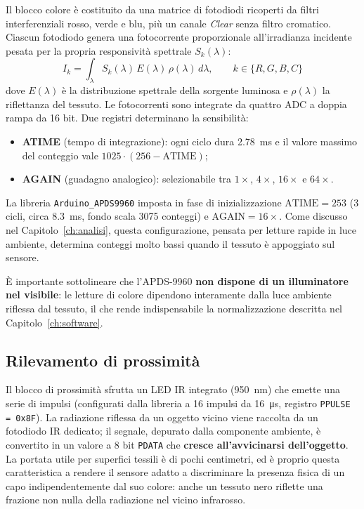 \documentclass[11pt,a4paper,twoside,openany]{report}
\begin{document}
Il blocco colore è costituito da una matrice di fotodiodi ricoperti da
filtri interferenziali rosso, verde e blu, più un canale
\textit{Clear} senza filtro cromatico. Ciascun fotodiodo genera una
fotocorrente proporzionale all'irradianza incidente pesata per la
propria responsività spettrale $S_k(\lambda)$:
\begin{equation}
  I_k = \int_{\lambda} S_k(\lambda)\, E(\lambda)\, \rho(\lambda)\, d\lambda,
  \qquad k \in \{R, G, B, C\}
  \label{eq:fotocorrente}
\end{equation}
dove $E(\lambda)$ è la distribuzione spettrale della sorgente luminosa e
$\rho(\lambda)$ la riflettanza del tessuto. Le fotocorrenti sono
integrate da quattro ADC a doppia rampa da 16 bit. Due registri
determinano la sensibilità:

\begin{itemize}
  \item \textbf{ATIME} (tempo di integrazione): ogni ciclo dura
        \SI{2.78}{ms} e il valore massimo del conteggio vale
        $1025 \cdot (256 - \mathrm{ATIME})$;
  \item \textbf{AGAIN} (guadagno analogico): selezionabile tra
        $1\times$, $4\times$, $16\times$ e $64\times$.
\end{itemize}

La libreria \texttt{Arduino\_APDS9960} imposta in fase di
inizializzazione $\mathrm{ATIME} = 253$ (3 cicli, circa
\SI{8.3}{ms}, fondo scala 3075 conteggi) e $\mathrm{AGAIN} = 16\times$.
Come discusso nel Capitolo~\ref{ch:analisi}, questa configurazione,
pensata per letture rapide in luce ambiente, determina conteggi molto
bassi quando il tessuto è appoggiato sul sensore.

È importante sottolineare che l'APDS-9960 \textbf{non dispone di un
illuminatore nel visibile}: le letture di colore dipendono interamente
dalla luce ambiente riflessa dal tessuto, il che rende indispensabile la
normalizzazione descritta nel Capitolo~\ref{ch:software}.

\subsection{Rilevamento di prossimità}

Il blocco di prossimità sfrutta un LED IR integrato (\SI{950}{nm}) che
emette una serie di impulsi (configurati dalla libreria a 16 impulsi da
\SI{16}{\micro s}, registro \texttt{PPULSE = 0x8F}). La radiazione
riflessa da un oggetto vicino viene raccolta da un fotodiodo IR
dedicato; il segnale, depurato dalla componente ambiente, è convertito
in un valore a 8 bit \texttt{PDATA} che \textbf{cresce all'avvicinarsi
dell'oggetto}. La portata utile per superfici tessili è di pochi
centimetri, ed è proprio questa caratteristica a rendere il sensore
adatto a discriminare la presenza fisica di un capo indipendentemente
dal suo colore: anche un tessuto nero riflette una frazione non nulla
della radiazione nel vicino infrarosso.
\end{document}
